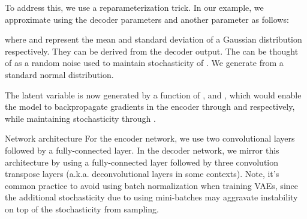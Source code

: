 To address this, we use a reparameterization trick. In our example, we approximate  using the decoder parameters and another parameter  as follows:

where  and  represent the mean and standard deviation of a Gaussian distribution respectively. They can be derived from the decoder output. The  can be thought of as a random noise used to maintain stochasticity of . We generate  from a standard normal distribution.

The latent variable  is now generated by a function of ,  and , which would enable the model to backpropagate gradients in the encoder through  and  respectively, while maintaining stochasticity through .

Network architecture
For the encoder network, we use two convolutional layers followed by a fully-connected layer. In the decoder network, we mirror this architecture by using a fully-connected layer followed by three convolution transpose layers (a.k.a. deconvolutional layers in some contexts). Note, it's common practice to avoid using batch normalization when training VAEs, since the additional stochasticity due to using mini-batches may aggravate instability on top of the stochasticity from sampling.
\fi
